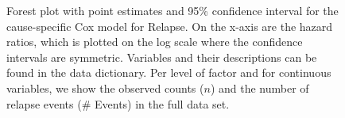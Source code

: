 \documentclass[
  letterpaper,
  DIV=11,
  numbers=noendperiod]{scrreprt}
\begin{document}
\begin{figure}


\caption{\label{fig-forest-rel}Forest plot with point estimates and 95\%
confidence interval for the cause-specific Cox model for Relapse. On the
x-axis are the hazard ratios, which is plotted on the log scale where
the confidence intervals are symmetric. Variables and their descriptions
can be found in the data dictionary. Per level of factor and for
continuous variables, we show the observed counts (\(n\)) and the number
of relapse events (\# Events) in the full data set.}

\end{figure}%
\end{document}
